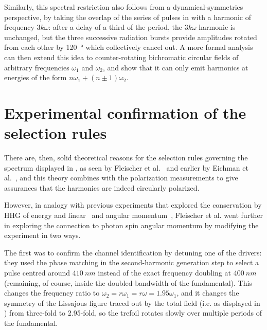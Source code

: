 Similarly, this spectral restriction also follows from a dynamical-symmetries perspective, by taking the overlap of the series of pulses in  with a harmonic of frequency $3k\omega$: after a delay of a third of the period, the $3k\omega$ harmonic is unchanged, but the three successive radiation bursts provide amplitudes rotated from each other by \SI{120}{\degree} which collectively cancel out. A more formal analysis~\cite{SelectionRulesInHHG, averbukh_stability_2002} can then extend this idea to counter-rotating bichromatic circular fields of arbitrary frequencies $\omega_1$ and $\omega_2$, and show that it can only emit harmonics at energies of the form $n\omega_1+(n\pm 1)\omega_2$.





\section{Experimental confirmation of the selection rules}
There are, then, solid theoretical reasons for the selection rules governing the spectrum displayed in , as seen by Fleischer et al.~\cite{fleischer_spin_2014} and earlier by Eichman et al.~\cite{EichmannExperiment}, and this theory combines with the polarization measurements to give assurances that the harmonics are indeed circularly polarized.

However, in analogy with previous experiments that explored the conservation by HHG of energy \cite{EnergyConservationExperiment} and linear~\cite{ MomentumConservationExperiment} and angular momentum~\cite{ OAMConservationExperiment}, Fleischer et al. went further in exploring the connection to photon spin angular momentum by modifying the experiment in two ways.

The first was to confirm the channel identification by detuning one of the drivers: they used the phase matching in the second-harmonic generation step to select a pulse centred around $\SI{410}{nm}$ instead of the exact frequency doubling at $\SI{400}{nm}$ (remaining, of course, inside the doubled bandwidth of the fundamental). This changes the frequency ratio to $\omega_2=r\omega_1=r\omega=1.95\omega_1$, and it changes the symmetry of the Lissajous figure traced out by the total field (i.e. as displayed in ) from three-fold to 2.95-fold, so the trefoil rotates slowly over multiple periods of the fundamental. 

